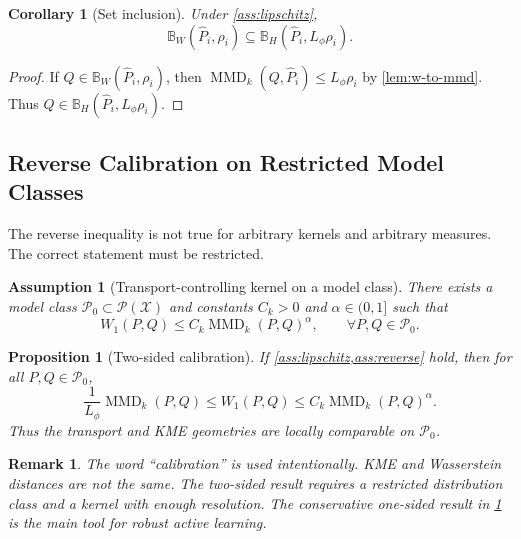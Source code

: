 \documentclass[10pt,journal]{IEEEtran}
\newtheorem{assumption}{Assumption}
\newtheorem{proposition}{Proposition}
\newtheorem{corollary}{Corollary}
\newtheorem{remark}{Remark}
\DeclareMathOperator{\MMD}{MMD}
\newcommand{\Pcal}{\mathcal{P}}
\newcommand{\Xcal}{\mathcal{X}}
\newcommand{\wh}{\widehat}
\newcommand{\ball}{\mathbb{B}}
\begin{document}
\begin{corollary}[Set inclusion]
\label{cor:set-inclusion}
Under \cref{ass:lipschitz},
\begin{equation}
    \ball_W(\wh P_i,\rho_i)\subseteq \ball_H(\wh P_i,L_\phi\rho_i).
\end{equation}
\end{corollary}

\begin{proof}
If $Q\in\ball_W(\wh P_i,\rho_i)$, then $\MMD_k(Q,\wh P_i)\le L_\phi\rho_i$ by \cref{lem:w-to-mmd}. Thus $Q\in\ball_H(\wh P_i,L_\phi\rho_i)$.
\end{proof}

\subsection{Reverse Calibration on Restricted Model Classes}

The reverse inequality is not true for arbitrary kernels and arbitrary measures. The correct statement must be restricted.

\begin{assumption}[Transport-controlling kernel on a model class]
\label{ass:reverse}
There exists a model class $\Pcal_0\subset\Pcal(\Xcal)$ and constants $C_k>0$ and $\alpha\in(0,1]$ such that
\begin{equation}
\label{eq:reverse}
    W_1(P,Q)\le C_k \MMD_k(P,Q)^\alpha,
    \qquad \forall P,Q\in\Pcal_0.
\end{equation}
\end{assumption}

\begin{proposition}[Two-sided calibration]
\label{prop:two-sided}
If \cref{ass:lipschitz,ass:reverse} hold, then for all $P,Q\in\Pcal_0$,
\begin{equation}
    \frac{1}{L_\phi}\MMD_k(P,Q)\le W_1(P,Q)\le C_k \MMD_k(P,Q)^\alpha.
\end{equation}
Thus the transport and KME geometries are locally comparable on $\Pcal_0$.
\end{proposition}

\begin{remark}
The word ``calibration'' is used intentionally. KME and Wasserstein distances are not the same. The two-sided result requires a restricted distribution class and a kernel with enough resolution. The conservative one-sided result in \cref{cor:set-inclusion} is the main tool for robust active learning.
\end{remark}
\end{document}
